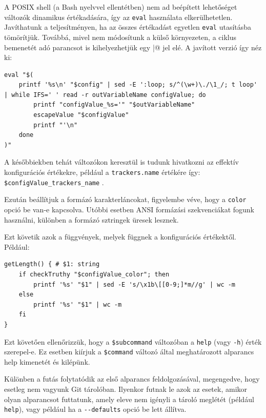 \documentclass[
]{elteikthesis}[2025/03/25]
\begin{document}
A POSIX shell (a Bash nyelvvel ellentétben) nem ad beépített lehetőséget változók dinamikus értékadására,
így az \verb|eval| használata elkerülhetetlen.
Javíthatunk a teljesítményen, ha az összes értékadást egyetlen \verb|eval| utasításba tömörítjük.
Továbbá, mivel nem módosítunk a külső környezeten,
a ciklus bemenetét adó parancsot is kihelyezhetjük egy \verb@|@ jel elé.
A javított verzió így néz ki:

\begin{listing}[H]
\begin{verbatim}
eval "$(
    printf '%s\n' "$config" | sed -E ':loop; s/^(\w+)\./\1_/; t loop' | while IFS=' ' read -r outVariableName configValue; do
        printf "configValue_%s='" "$outVariableName"
        escapeValue "$configValue"
        printf "'\n"
    done
)"
\end{verbatim}
\caption{Optimalizált eval loop}
\end{listing}

A későbbiekben tehát változókon keresztül is tudunk hivatkozni az effektív konfigurációs értékekre,
például a \verb|trackers.name| értékére így: \verb|$configValue_trackers_name| .

Ezután beállítjuk a formázó karakterláncokat,
figyelembe véve, hogy a \verb|color| opció be van-e kapcsolva.
Utóbbi esetben ANSI formázási szekvenciákat fogunk használni,
különben a formázó sztringek üresek lesznek.

Ezt követik azok a függvények, melyek függnek a konfigurációs értékektől.
Például:

\begin{listing}[H]
\begin{verbatim}
getLength() { # $1: string
    if checkTruthy "$configValue_color"; then
        printf '%s' "$1" | sed -E 's/\x1b\[[0-9;]*m//g' | wc -m
    else
        printf '%s' "$1" | wc -m
    fi
}
\end{verbatim}
\caption{Szöveg hosszának lekérése az ANSI formázások feltételes figyelembevételével}
\end{listing}

Ezt követően ellenőrizzük, hogy a \verb|$subcommand| változóban
a \verb|help| (vagy \verb|-h|) érték szerepel-e.
Ez esetben kiírjuk a \verb|$command| változó által meghatározott alparancs help kimenetét és kilépünk.

Különben a futás folytatódik az első alparancs feldolgozásával,
megengedve, hogy esetleg nem vagyunk Git tárolóban.
Ilyenkor futnak le azok az esetek, amikor olyan alparancsot futtatunk,
amely eleve nem igényli a tároló meglétét (például \verb|help|),
vagy például ha a \verb|--defaults| opció be lett állítva.
\end{document}

